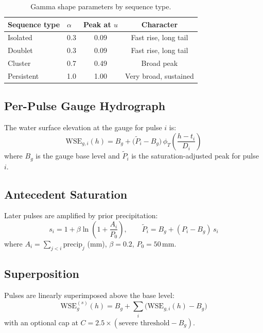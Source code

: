 \documentclass[11pt,a4paper]{article}
\begin{document}
\begin{table}[H]
    \centering
    \caption{Gamma shape parameters by sequence type.}
    \label{tab:alpha_params}
    \begin{tabular}{llcc}
        \toprule
        \textbf{Sequence type} & \textbf{$\alpha$} & \textbf{Peak at $u$} & \textbf{Character} \\
        \midrule
        Isolated  & 0.3 & 0.09 & Fast rise, long tail \\
        Doublet   & 0.3 & 0.09 & Fast rise, long tail \\
        Cluster   & 0.7 & 0.49 & Broad peak \\
        Persistent & 1.0 & 1.00 & Very broad, sustained \\
        \bottomrule
    \end{tabular}
\end{table}

\subsection{Per-Pulse Gauge Hydrograph}
The water surface elevation at the gauge for pulse $i$ is:
\begin{equation}
    \mathrm{WSE}_{g,i}(h) = B_g + \bigl(\tilde{P}_i - B_g\bigr)\,\phi_T\!\left(\frac{h - t_i}{D_i}\right)
\end{equation}
where $B_g$ is the gauge base level and $\tilde{P}_i$ is the saturation-adjusted
peak for pulse $i$.

\subsection{Antecedent Saturation}
Later pulses are amplified by prior precipitation:
\begin{equation}
    s_i = 1 + \beta \ln\!\left(1 + \frac{A_i}{P_0}\right), \qquad
    \tilde{P}_i = B_g + (P_i - B_g)\,s_i
\end{equation}
where $A_i = \sum_{j < i} \mathrm{precip}_j$ (mm), $\beta = 0.2$, $P_0 = 50$\,mm.

\subsection{Superposition}
Pulses are linearly superimposed above the base level:
\begin{equation}
    \mathrm{WSE}_g^{(s)}(h) = B_g + \sum_{i} \bigl(\mathrm{WSE}_{g,i}(h) - B_g\bigr)
\end{equation}
with an optional cap at $C = 2.5 \times (\text{severe threshold} - B_g)$.
\end{document}
